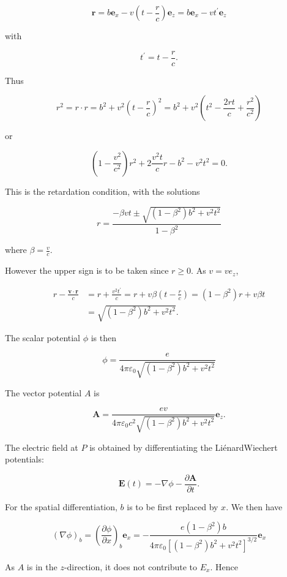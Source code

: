 \documentclass[10pt]{article}
\begin{document}
$$
\mathbf{r}=b \mathbf{e}_{x}-v\left(t-\frac{r}{c}\right) \mathbf{e}_{z}=b \mathbf{e}_{x}-v t^{\prime} \mathbf{e}_{z}
$$

with

$$
t^{\prime}=t-\frac{r}{c} .
$$

Thus

$$
r^{2}=r \cdot r=b^{2}+v^{2}\left(t-\frac{r}{c}\right)^{2}=b^{2}+v^{2}\left(t^{2}-\frac{2 r t}{c}+\frac{r^{2}}{c^{2}}\right)
$$

or

$$
\left(1-\frac{v^{2}}{c^{2}}\right) r^{2}+2 \frac{v^{2} t}{c} r-b^{2}-v^{2} t^{2}=0 .
$$

This is the retardation condition, with the solutions

$$
r=\frac{-\beta v t \pm \sqrt{\left(1-\beta^{2}\right) b^{2}+v^{2} t^{2}}}{1-\beta^{2}}
$$

where $\beta=\frac{v}{c}$.

However the upper sign is to be taken since $r \geq 0$. As $v=v e_{z}$,

$$
\begin{aligned}
r-\frac{\mathbf{v} \cdot \mathbf{r}}{c} &=r+\frac{v^{2} t^{\prime}}{c}=r+v \beta\left(t-\frac{r}{c}\right)=\left(1-\beta^{2}\right) r+v \beta t \\
&=\sqrt{\left(1-\beta^{2}\right) b^{2}+v^{2} t^{2}} .
\end{aligned}
$$

The scalar potential $\phi$ is then

$$
\phi=\frac{e}{4 \pi \varepsilon_{0} \sqrt{\left(1-\beta^{2}\right) b^{2}+v^{2} t^{2}}}
$$

 The vector potential $A$ is

$$
\mathbf{A}=\frac{e v}{4 \pi \varepsilon_{0} c^{2} \sqrt{\left(1-\beta^{2}\right) b^{2}+v^{2} t^{2}}} \mathbf{e}_{z} .
$$

 The electric field at $P$ is obtained by differentiating the LiénardWiechert potentials:

$$
\mathbf{E}(t)=-\nabla \phi-\frac{\partial \mathbf{A}}{\partial t} .
$$

For the spatial differentiation, $b$ is to be first replaced by $x$. We then have

$$
(\nabla \phi)_{b}=\left(\frac{\partial \phi}{\partial x}\right)_{b} \mathbf{e}_{x}=-\frac{e\left(1-\beta^{2}\right) b}{4 \pi \varepsilon_{0}\left[\left(1-\beta^{2}\right) b^{2}+v^{2} t^{2}\right]^{3 / 2}} \mathbf{e}_{x}
$$

As $A$ is in the $z$-direction, it does not contribute to $E_{x}$. Hence
\end{document}
